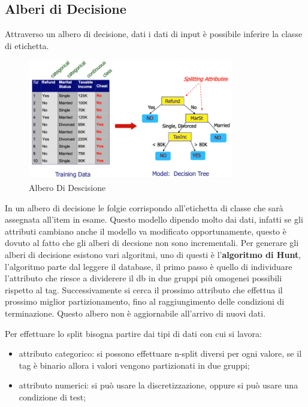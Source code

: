 \documentclass[12pt]{article}
\begin{document}
\subsection{Alberi di Decisione}
Attraverso un albero di decisione, dati i dati di input \`e possibile inferire la classe di etichetta.
\begin{figure}[H]
    \centering
    \includegraphics[width=0.8\textwidth]{albero-di-descisione.png}
    \caption{Albero Di Descisione}
    \label{fig:albero-di-descisione}
\end{figure}
In un albero di decisione le folgie corrispondo all'etichetta di classe che sar\`a assegnata all'item in esame. Questo modello dipendo molto dai dati, infatti se gli attributi cambiano anche il modello va modificato opportunamente, questo \`e dovuto al fatto che gli alberi di decsione non sono incrementali. Per generare gli alberi di decisione esistono vari algoritmi, uno di questi \`e l'\textbf{algoritmo di Hunt}, l'algoritmo parte dal leggere il database, il primo passo \`e quello di individuare l'attributo che riesce a dividerere il db in due gruppi pi\`u omogenei possibili rispetto al tag. Successivamente si cerca il prossimo attributo che effettua il prossimo miglior partizionamento, fino al raggiungimento delle condizioni di terminazione. Questo albero non \`e aggiornabile all'arrivo di nuovi dati.

Per effettuare lo split bisogna partire dai tipi di dati con cui si lavora:
\begin{itemize}
    \item attributo categorico: si possono effettuare n-split diversi per ogni valore, se il tag \`e binario allora i valori vengono partizionati in due gruppi;
    \item attributo numerici: si pu\`o usare la discretizzazione, oppure si pu\`o usare una condizione di test;
\end{itemize}
\end{document}
